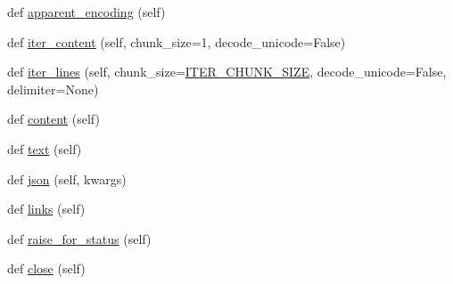 \begin{DoxyCompactItemize}
\item 
def \hyperlink{classpip_1_1__vendor_1_1requests_1_1models_1_1Response_a69b4988a89cdf1b94c41086584456f70}{apparent\+\_\+encoding} (self)
\item 
def \hyperlink{classpip_1_1__vendor_1_1requests_1_1models_1_1Response_a68fc80b1a8efaf75851183d892434abe}{iter\+\_\+content} (self, chunk\+\_\+size=1, decode\+\_\+unicode=False)
\item 
def \hyperlink{classpip_1_1__vendor_1_1requests_1_1models_1_1Response_ad14c236faeacc61ae5a6cc0a5d8b67d1}{iter\+\_\+lines} (self, chunk\+\_\+size=\hyperlink{namespacepip_1_1__vendor_1_1requests_1_1models_a0842472b82f9b8ca12707acd13dbbe38}{I\+T\+E\+R\+\_\+\+C\+H\+U\+N\+K\+\_\+\+S\+I\+ZE}, decode\+\_\+unicode=False, delimiter=None)
\item 
def \hyperlink{classpip_1_1__vendor_1_1requests_1_1models_1_1Response_a67d31914dfe1fd779e022fb6f8a61eee}{content} (self)
\item 
def \hyperlink{classpip_1_1__vendor_1_1requests_1_1models_1_1Response_a62a305a37be74c9dfaae9452fe2e2291}{text} (self)
\item 
def \hyperlink{classpip_1_1__vendor_1_1requests_1_1models_1_1Response_ab1d597fec41c082432e0ee22d46e5783}{json} (self, kwargs)
\item 
def \hyperlink{classpip_1_1__vendor_1_1requests_1_1models_1_1Response_a15dba82018e412fafd2c94fb43548e77}{links} (self)
\item 
def \hyperlink{classpip_1_1__vendor_1_1requests_1_1models_1_1Response_a786847f30e14732dd7d4ac5dfacebac2}{raise\+\_\+for\+\_\+status} (self)
\item 
def \hyperlink{classpip_1_1__vendor_1_1requests_1_1models_1_1Response_a9ebc5dbbf4fdbfaecf0ee697d1b03a6f}{close} (self)
\end{DoxyCompactItemize}
